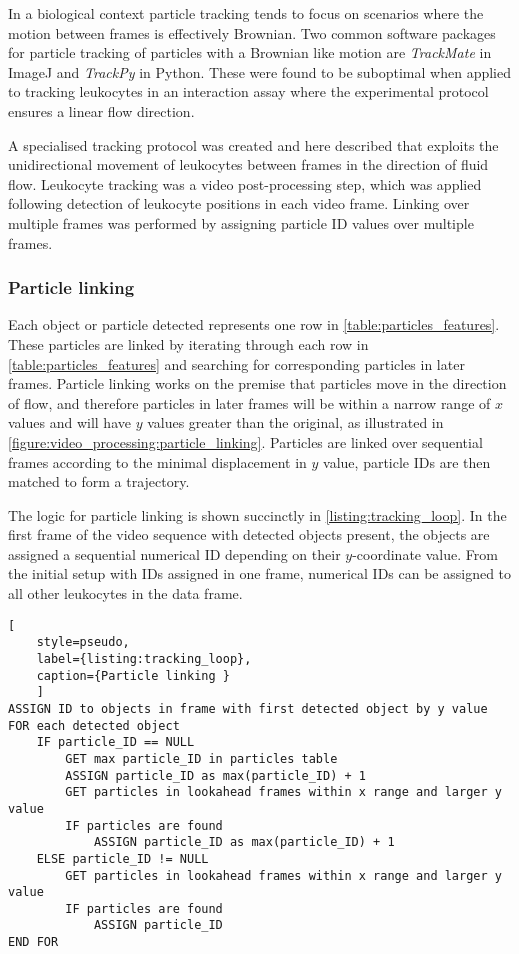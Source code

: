 In a biological context particle tracking tends to focus on scenarios where the motion between frames is effectively Brownian. Two common software packages for particle tracking of particles with a Brownian like motion are \emph{TrackMate} in ImageJ and \emph{TrackPy} in Python. These were found to be suboptimal when applied to tracking leukocytes in an interaction assay where the experimental protocol ensures a linear flow direction.

A specialised tracking protocol was created and here described that exploits the unidirectional movement of leukocytes between frames in the direction of fluid flow. Leukocyte tracking was a video post-processing step, which was applied following detection of leukocyte positions in each video frame. Linking over multiple frames was performed by assigning particle ID values over multiple frames.

\subsubsection{Particle linking}
Each object or particle detected represents one row in \autoref{table:particles_features}. These particles are linked by iterating through each row in \autoref{table:particles_features} and searching for corresponding particles in later frames. Particle linking works on the premise that particles move in the direction of flow, and therefore particles in later frames will be within a narrow range of $x$ values and will have $y$ values greater than the original, as illustrated in \autoref{figure:video_processing:particle_linking}. Particles are linked over sequential frames according to the minimal displacement in $y$ value, particle IDs are then matched to form a trajectory.

The logic for particle linking is shown succinctly in \autoref{listing:tracking_loop}. In the first frame of the video sequence with detected objects present, the objects are assigned a sequential numerical ID depending on their $y$-coordinate value. From the initial setup with IDs assigned in one frame, numerical IDs can be assigned to all other leukocytes in the data frame.

\begin{lstlisting}[
	style=pseudo,
	label={listing:tracking_loop},
	caption={Particle linking }
	]
ASSIGN ID to objects in frame with first detected object by y value
FOR each detected object
	IF particle_ID == NULL
		GET max particle_ID in particles table
		ASSIGN particle_ID as max(particle_ID) + 1
		GET particles in lookahead frames within x range and larger y value
		IF particles are found
			ASSIGN particle_ID as max(particle_ID) + 1
	ELSE particle_ID != NULL
		GET particles in lookahead frames within x range and larger y value
		IF particles are found
			ASSIGN particle_ID
END FOR
\end{lstlisting}

